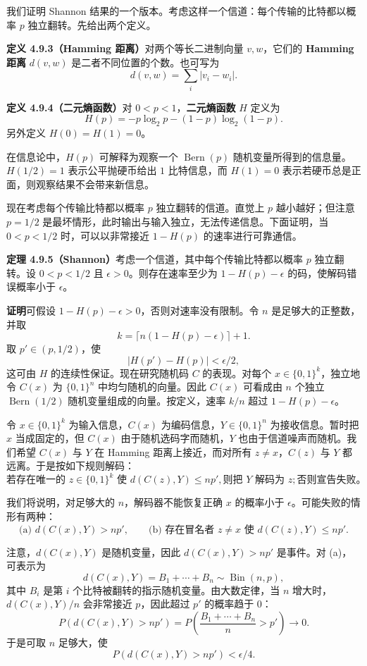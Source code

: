 \documentclass[UTF8, 12pt, fontset=fandol, oneside]{ctexart}
\begin{document}
我们证明 Shannon 结果的一个版本。考虑这样一个信道：每个传输的比特都以概率 $p$ 独立翻转。先给出两个定义。

\noindent\textbf{定义 4.9.3（Hamming 距离）}\quad 对两个等长二进制向量 $v,w$，它们的 \textbf{Hamming 距离} $d(v,w)$ 是二者不同位置的个数。也可写为
\[
  d(v,w)=\sum_i |v_i-w_i|.
\]

\noindent\textbf{定义 4.9.4（二元熵函数）}\quad 对 $0<p<1$，\textbf{二元熵函数} $H$ 定义为
\[
  H(p)=-p\log_2p-(1-p)\log_2(1-p).
\]
另外定义 $H(0)=H(1)=0$。

在信息论中，$H(p)$ 可解释为观察一个 $\operatorname{Bern}(p)$ 随机变量所得到的信息量。$H(1/2)=1$ 表示公平抛硬币给出 $1$ 比特信息，而 $H(1)=0$ 表示若硬币总是正面，则观察结果不会带来新信息。

现在考虑每个传输比特都以概率 $p$ 独立翻转的信道。直觉上 $p$ 越小越好；但注意 $p=1/2$ 是最坏情形，此时输出与输入独立，无法传递信息。下面证明，当 $0<p<1/2$ 时，可以以非常接近 $1-H(p)$ 的速率进行可靠通信。

\noindent\textbf{定理 4.9.5（Shannon）}\quad 考虑一个信道，其中每个传输比特都以概率 $p$ 独立翻转。设 $0<p<1/2$ 且 $\epsilon>0$。则存在速率至少为 $1-H(p)-\epsilon$ 的码，使解码错误概率小于 $\epsilon$。

\noindent\textbf{证明}\quad 可假设 $1-H(p)-\epsilon>0$，否则对速率没有限制。令 $n$ 是足够大的正整数，并取
\[
  k=\lceil n(1-H(p)-\epsilon)\rceil+1.
\]
取 $p'\in(p,1/2)$，使
\[
  |H(p')-H(p)|<\epsilon/2,
\]
这可由 $H$ 的连续性保证。现在研究随机码 $C$ 的表现。对每个 $x\in\{0,1\}^k$，独立地令 $C(x)$ 为 $\{0,1\}^n$ 中均匀随机的向量。因此 $C(x)$ 可看成由 $n$ 个独立 $\operatorname{Bern}(1/2)$ 随机变量组成的向量。按定义，速率 $k/n$ 超过 $1-H(p)-\epsilon$。

令 $x\in\{0,1\}^k$ 为输入信息，$C(x)$ 为编码信息，$Y\in\{0,1\}^n$ 为接收信息。暂时把 $x$ 当成固定的，但 $C(x)$ 由于随机选码字而随机，$Y$ 也由于信道噪声而随机。我们希望 $C(x)$ 与 $Y$ 在 Hamming 距离上接近，而对所有 $z\ne x$，$C(z)$ 与 $Y$ 都远离。于是按如下规则解码：
\[
  \text{若存在唯一的 }z\in\{0,1\}^k\text{ 使 }d(C(z),Y)\le np',
  \text{则把 }Y\text{ 解码为 }z;\text{否则宣告失败。}
\]

我们将说明，对足够大的 $n$，解码器不能恢复正确 $x$ 的概率小于 $\epsilon$。可能失败的情形有两种：
\[
  \text{(a) }d(C(x),Y)>np',
  \qquad
  \text{(b) 存在冒名者 }z\ne x\text{ 使 }d(C(z),Y)\le np'.
\]

注意，$d(C(x),Y)$ 是随机变量，因此 $d(C(x),Y)>np'$ 是事件。对 (a)，可表示为
\[
  d(C(x),Y)=B_1+\cdots+B_n\sim\operatorname{Bin}(n,p),
\]
其中 $B_i$ 是第 $i$ 个比特被翻转的指示随机变量。由大数定律，当 $n$ 增大时，$d(C(x),Y)/n$ 会非常接近 $p$，因此超过 $p'$ 的概率趋于 $0$：
\[
  P(d(C(x),Y)>np')
  =P\left(\frac{B_1+\cdots+B_n}{n}>p'\right)\to 0.
\]
于是可取 $n$ 足够大，使
\[
  P(d(C(x),Y)>np')<\epsilon/4.
\]
\end{document}
